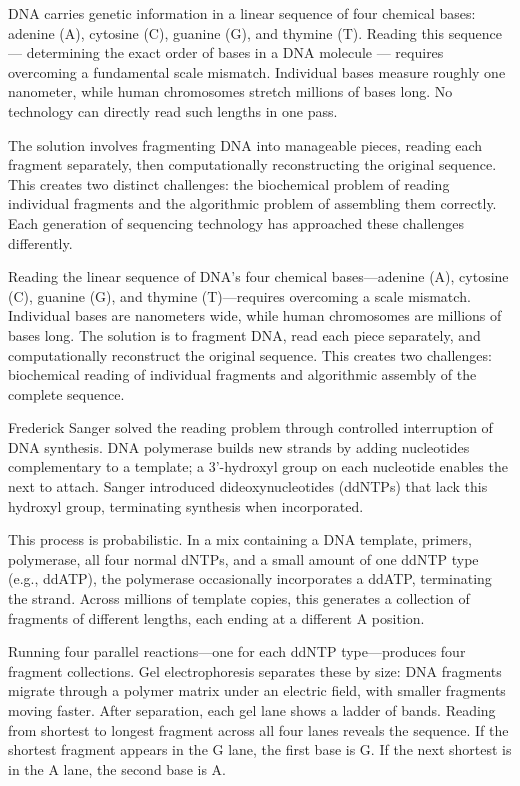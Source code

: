 DNA carries genetic information in a linear sequence of four chemical bases: adenine (A), cytosine (C), guanine (G), and thymine (T). Reading this sequence — determining the exact order of bases in a DNA molecule — requires overcoming a fundamental scale mismatch. Individual bases measure roughly one nanometer, while human chromosomes stretch millions of bases long. No technology can directly read such lengths in one pass.

The solution involves fragmenting DNA into manageable pieces, reading each fragment separately, then computationally reconstructing the original sequence. This creates two distinct challenges: the biochemical problem of reading individual fragments and the algorithmic problem of assembling them correctly. Each generation of sequencing technology has approached these challenges differently.

Reading the linear sequence of DNA's four chemical bases—adenine (A), cytosine (C), guanine (G), and thymine (T)—requires overcoming a scale mismatch. Individual bases are nanometers wide, while human chromosomes are millions of bases long. The solution is to fragment DNA, read each piece separately, and computationally reconstruct the original sequence. This creates two challenges: biochemical reading of individual fragments and algorithmic assembly of the complete sequence.

Frederick Sanger solved the reading problem through controlled interruption of DNA synthesis. DNA polymerase builds new strands by adding nucleotides complementary to a template; a 3'-hydroxyl group on each nucleotide enables the next to attach. Sanger introduced dideoxynucleotides (ddNTPs) that lack this hydroxyl group, terminating synthesis when incorporated.

This process is probabilistic. In a mix containing a DNA template, primers, polymerase, all four normal dNTPs, and a small amount of one ddNTP type (e.g., ddATP), the polymerase occasionally incorporates a ddATP, terminating the strand. Across millions of template copies, this generates a collection of fragments of different lengths, each ending at a different A position.

Running four parallel reactions—one for each ddNTP type—produces four fragment collections. Gel electrophoresis separates these by size: DNA fragments migrate through a polymer matrix under an electric field, with smaller fragments moving faster. After separation, each gel lane shows a ladder of bands. Reading from shortest to longest fragment across all four lanes reveals the sequence. If the shortest fragment appears in the G lane, the first base is G. If the next shortest is in the A lane, the second base is A.

